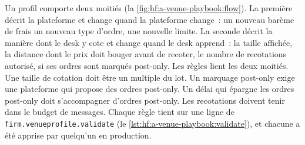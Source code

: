 Un profil comporte deux moitiés (la \cref{fig:hf:a-venue-playbook:flow}). La première décrit la plateforme et change quand la plateforme change~: un nouveau barème de frais
un nouveau type d'ordre, une nouvelle limite. La seconde décrit la manière dont le desk y cote et change quand le desk apprend~: la taille affichée, la distance dont
le prix doit bouger avant de recoter, le nombre de recotations autorisé, si ses ordres sont marqués post-only. Les règles lient les deux moitiés. Une
taille de cotation doit être un multiple du lot. Un marquage post-only exige une plateforme qui propose des ordres post-only. Un délai qui épargne les ordres post-only
doit s'accompagner d'ordres post-only. Les recotations doivent tenir dans le budget de messages. Chaque règle tient sur une ligne de \texttt{firm.venueprofile.validate}
(le \cref{lst:hf:a-venue-playbook:validate}), et chacune a été apprise par quelqu'un en production.

